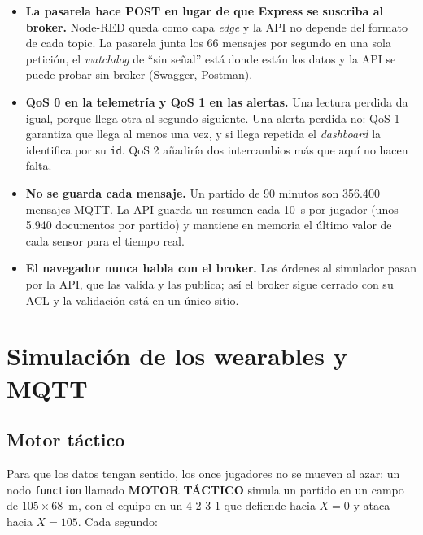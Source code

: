 \documentclass[runningheads]{llncs}
\begin{document}
\begin{itemize}
  \item \textbf{La pasarela hace POST en lugar de que Express se suscriba al broker.} Node-RED queda como capa \emph{edge} y la API no depende del formato de cada topic. La pasarela junta los 66 mensajes por segundo en una sola petición, el \emph{watchdog} de ``sin señal'' está donde están los datos y la API se puede probar sin broker (Swagger, Postman).
  \item \textbf{QoS 0 en la telemetría y QoS 1 en las alertas.} Una lectura perdida da igual, porque llega otra al segundo siguiente. Una alerta perdida no: QoS 1 garantiza que llega al menos una vez, y si llega repetida el \emph{dashboard} la identifica por su \texttt{id}. QoS 2 añadiría dos intercambios más que aquí no hacen falta.
  \item \textbf{No se guarda cada mensaje.} Un partido de 90 minutos son 356.400 mensajes MQTT. La API guarda un resumen cada 10~s por jugador (unos 5.940 documentos por partido) y mantiene en memoria el último valor de cada sensor para el tiempo real.
  \item \textbf{El navegador nunca habla con el broker.} Las órdenes al simulador pasan por la API, que las valida y las publica; así el broker sigue cerrado con su ACL y la validación está en un único sitio.
\end{itemize}

\section{Simulación de los wearables y MQTT}

\subsection{Motor táctico}

Para que los datos tengan sentido, los once jugadores no se mueven al azar: un nodo \texttt{function} llamado \textbf{MOTOR TÁCTICO} simula un partido en un campo de $105\times68$~m, con el equipo en un 4-2-3-1 que defiende hacia $X=0$ y ataca hacia $X=105$. Cada segundo:
\end{document}
